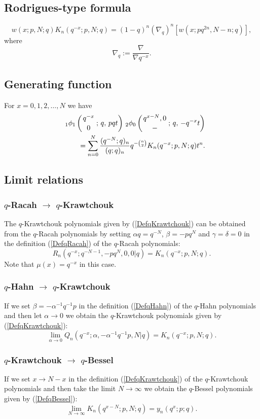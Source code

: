 \documentclass[envcountchap,graybox]{svmono}
\newcounter{rom}
\newcommand{\qhyp}[5]{\mbox{}_{#1}{\phi}_{#2}
\left(\genfrac{}{}{0pt}{}{#3}{#4}\,;\,q,\,#5\right)}
\begin{document}
\subsection*{Rodrigues-type formula}
\begin{equation}
\label{RodqKrawtchouk}
w(x;p,N;q)K_n(q^{-x};p,N;q)=(1-q)^n\left(\nabla_q\right)^n\left[w(x;pq^{2n},N-n;q)\right],
\end{equation}
where
$$\nabla_q:=\frac{\nabla}{\nabla q^{-x}}.$$

\subsection*{Generating function} For $x=0,1,2,\ldots,N$ we have
\begin{eqnarray}
\label{GenqKrawtchouk}
& &\qhyp{1}{1}{q^{-x}}{0}{pqt}\,\qhyp{2}{0}{q^{x-N},0}{-}{-q^{-x}t}\nonumber\\
& &{}=\sum_{n=0}^N\frac{(q^{-N};q)_n}{(q;q)_n}q^{-\binom{n}{2}}K_n(q^{-x};p,N;q)t^n.
\end{eqnarray}

\subsection*{Limit relations}

\subsubsection*{$q$-Racah $\rightarrow$ $q$-Krawtchouk}
The $q$-Krawtchouk polynomials given by (\ref{DefqKrawtchouk}) can be obtained from
the $q$-Racah polynomials by setting $\alpha q=q^{-N}$, $\beta=-pq^N$ and
$\gamma=\delta=0$ in the definition (\ref{DefqRacah}) of the $q$-Racah polynomials:
$$R_n(q^{-x};q^{-N-1},-pq^N,0,0|q)=K_n(q^{-x};p,N;q).$$
Note that $\mu(x)=q^{-x}$ in this case.

\subsubsection*{$q$-Hahn $\rightarrow$ $q$-Krawtchouk}
If we set $\beta=-\alpha^{-1}q^{-1}p$ in the definition (\ref{DefqHahn}) of the $q$-Hahn polynomials
and then let $\alpha\rightarrow 0$ we obtain the $q$-Krawtchouk polynomials given by
(\ref{DefqKrawtchouk}):
$$\lim_{\alpha\rightarrow 0}
Q_n(q^{-x};\alpha,-\alpha^{-1}q^{-1}p,N|q)=K_n(q^{-x};p,N;q).$$

\subsubsection*{$q$-Krawtchouk $\rightarrow$ $q$-Bessel}
If we set $x\rightarrow N-x$ in the definition (\ref{DefqKrawtchouk}) of the
$q$-Krawtchouk polynomials and then take the limit $N\rightarrow\infty$ we
obtain the $q$-Bessel polynomials given by (\ref{DefqBessel}):
\begin{equation}
\lim_{N\rightarrow\infty}K_n(q^{x-N};p,N;q)=y_n(q^x;p;q).
\end{equation}
\end{document}
